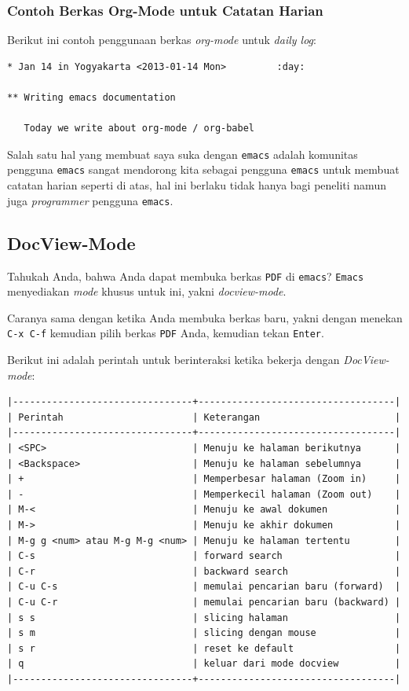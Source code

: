 \documentclass{article}
\begin{document}
\subsubsection{Contoh Berkas Org-Mode untuk Catatan Harian}
Berikut ini contoh penggunaan berkas \emph{org-mode} untuk \emph{daily log}:

\begin{verbatim}
* Jan 14 in Yogyakarta <2013-01-14 Mon>			:day:

** Writing emacs documentation

   Today we write about org-mode / org-babel
\end{verbatim}

Salah satu hal yang membuat saya suka dengan \verb=emacs= adalah komunitas
pengguna \verb=emacs= sangat mendorong kita sebagai pengguna \verb=emacs=
untuk membuat catatan harian seperti di atas, hal ini berlaku tidak hanya
bagi peneliti namun juga \emph{programmer} pengguna \verb=emacs=.

\subsection{DocView-Mode}
Tahukah Anda, bahwa Anda dapat membuka berkas \verb=PDF= di \verb=emacs=?
\verb=Emacs= menyediakan \emph{mode} khusus untuk ini, yakni 
\emph{docview-mode}.

Caranya sama dengan ketika Anda membuka berkas baru, yakni dengan menekan
\verb=C-x C-f= kemudian pilih berkas \verb=PDF= Anda, kemudian tekan 
\verb=Enter=.

Berikut ini adalah perintah untuk berinteraksi ketika bekerja dengan 
\emph{DocView-mode}:

\begin{verbatim}
|--------------------------------+-----------------------------------|
| Perintah                       | Keterangan                        |
|--------------------------------+-----------------------------------|
| <SPC>                          | Menuju ke halaman berikutnya      |
| <Backspace>                    | Menuju ke halaman sebelumnya      |
| +                              | Memperbesar halaman (Zoom in)     |
| -                              | Memperkecil halaman (Zoom out)    |
| M-<                            | Menuju ke awal dokumen            |
| M->                            | Menuju ke akhir dokumen           |
| M-g g <num> atau M-g M-g <num> | Menuju ke halaman tertentu        |
| C-s                            | forward search                    |
| C-r                            | backward search                   |
| C-u C-s                        | memulai pencarian baru (forward)  |
| C-u C-r                        | memulai pencarian baru (backward) |
| s s                            | slicing halaman                   |
| s m                            | slicing dengan mouse              |
| s r                            | reset ke default                  |
| q                              | keluar dari mode docview          |
|--------------------------------+-----------------------------------|
\end{verbatim}
\end{document}
